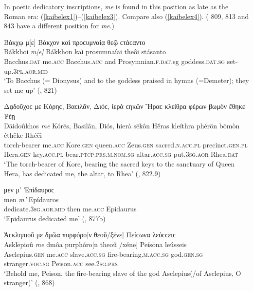 In poetic dedicatory inscriptions, \textit{me} is found in this position as late as the Roman era: (\ref{kaibelex1})--(\ref{kaibelex3}). Compare also (\ref{kaibelex4}). (\citet{Kaibel1878} 809, 813 and 843 have a different position for \textit{me}.)

\begin{exe}
\ex Βάκχῳ {μ{[}ε{]}} Βάκχον καὶ προϲυμναίᾳ θεῷ {ϲτάϲαντο}\\
\gll Bákkhōi \emph{m{[}e{]}} Bákkhon kaì prosumnaíāi theôi {stásanto}\\
Bacchus.\textsc{dat} me.\textsc{acc} Bacchus.\textsc{acc} and Prosymnian.\textsc{f.dat.}sg goddess.\textsc{dat.sg} set-up.\textsc{3pl.aor.mid}\\
\trans `To Bacchus (= Dionysus) and to the goddess praised in hymns (=Demeter); they set me up' (\citet{Kaibel1878}, 821)
\label{kaibelex1}
\end{exe}

\begin{exe}
\ex Δᾳδοῦχοϲ {με} Κόρηϲ, Βαϲιλᾶν, Διόϲ, ἱερὰ ϲηκῶν Ἥραϲ κλείθρα φέρων βωμὸν {ἔθηκε} Ῥέῃ\\
\gll Dāidoûkhos \emph{me} Kórēs, Basilân, Diós, hierà sēkôn Hḗras kleíthra phérōn bōmòn {éthēke} Rhéēi\\
torch-bearer me.\textsc{acc} Kore.\textsc{gen} queen.\textsc{acc} Zeus.\textsc{gen} sacred.\textsc{n.acc.pl} precinct.\textsc{gen.pl} Hera.\textsc{gen} key.\textsc{acc.pl} bear.\textsc{ptcp.prs.m.nom.sg} altar.\textsc{acc.sg} put.\textsc{3sg.aor} Rhea.\textsc{dat}\\
\trans `The torch-bearer of Kore, bearing the sacred keys to the sanctuary of Queen Hera, has dedicated me, the altar, to Rhea' (\citet{Kaibel1878}, 822.9)
\label{kaibelex2}
\end{exe}

\begin{exe}
 μεν μ᾽ Ἐπίδαυροϲ\\
 men \emph{m'} Epídauros\\
dedicate.\textsc{3sg.aor.mid} then me.\textsc{acc} Epidaurus\\
\trans `Epidaurus dedicated me' (\citet[XIX]{Kaibel1878}, 877b)
\label{kaibelex3}
\end{exe}

\begin{exe}
\ex Ἀϲκληπιοῦ {με} δμῶα πυρφόρο{[}ν θεοῦ/ξένε{]} Πείϲωνα {λεύϲϲειϲ}\\
\gll Asklēpioû \emph{me} dmôa purphóro{[}n theoû /xéne{]} Peísōna {leússeis}\\
Asclepius.\textsc{gen} me.\textsc{acc} slave.\textsc{acc.sg} fire-bearing.\textsc{m.acc.sg} god.\textsc{gen.sg} stranger.\textsc{voc.sg} Peison.\textsc{acc} see.\textsc{2sg.prs}\\
\trans `Behold me, Peison, the fire-bearing slave of the god Asclepius(/of Asclepius, O stranger)' (\citet{Kaibel1878}, 868)
\label{kaibelex4}
\end{exe}

